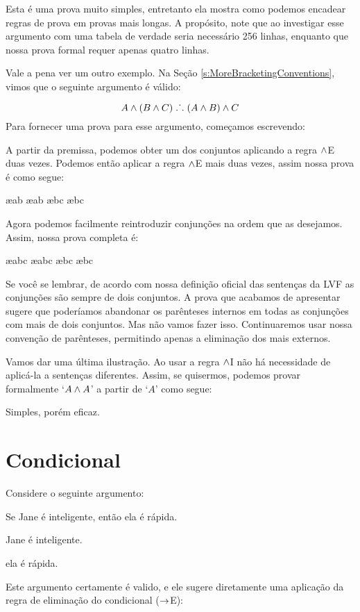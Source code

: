  Esta é uma prova muito simples, entretanto ela mostra como podemos encadear regras de  prova em provas mais longas.  A propósito, note que ao investigar esse argumento com uma tabela de verdade seria necessário 256 linhas, enquanto que nossa prova formal requer apenas quatro linhas.

Vale a pena ver um outro exemplo.  Na Seção   \ref{s:MoreBracketingConventions}, vimos  que o seguinte  argumento é válido:

	$$A \wedge (B \wedge C) \mathrel{\ldotp\dot{}\,\ldotp} (A \wedge B) \wedge C$$
 Para fornecer uma prova para esse argumento,  começamos escrevendo: 
\begin{fitchproof}
\end{fitchproof}
 A partir da premissa, podemos obter um dos conjuntos aplicando a regra $\wedge$E duas vezes. Podemos então aplicar a regra $\wedge$E mais duas vezes,  assim nossa prova é como segue: 
\begin{fitchproof}
	 \ae{ab}
	 \ae{ab}
	 \ae{bc}
	 \ae{bc}
\end{fitchproof}
 Agora podemos facilmente reintroduzir conjunções na ordem que as desejamos. Assim, nossa prova  completa é:
 
\begin{fitchproof}
	 \ae{abc}
	 \ae{abc}
	 \ae{bc}
	 \ae{bc}
\end{fitchproof}
Se você se lembrar, de acordo com nossa definição oficial das sentenças da LVF as conjunções são sempre de dois conjuntos. A prova que acabamos de apresentar sugere que poderíamos abandonar os parênteses internos em todas as conjunções com mais de dois conjuntos. Mas não vamos fazer isso. Continuaremos usar nossa convenção de parênteses, permitindo apenas a eliminação dos mais externos.

Vamos dar uma última ilustração. Ao usar a regra $\wedge$I 
não há necessidade de aplicá-la a sentenças diferentes.
Assim, se quisermos, podemos provar formalmente  `$A \wedge A$' a partir de `$A$' como  segue:
\begin{fitchproof}
\end{fitchproof}
Simples, porém eficaz.

\section{Condicional}
Considere o seguinte argumento:
\begin{earg}
		\item[] Se Jane é inteligente, então ela é rápida.
		\item[] Jane é inteligente.
		\item[\therefore] ela é rápida.
\end{earg}
Este argumento certamente é valido, e ele sugere diretamente uma aplicação da  regra de eliminação do condicional  ($\rightarrow$E):
 
